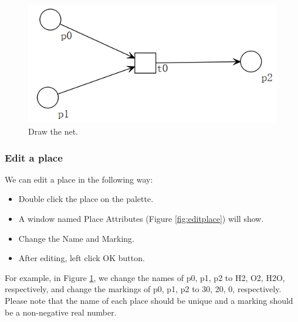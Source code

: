 \documentclass[journal,a4paper,onecolumn]{article}
\begin{document}
\begin{figure}[!hbt]
	\begin{center}
		\includegraphics[width=\columnwidth]{fig2}
		\caption{Draw the net.}
		\label{fig:drawnet}
	\end{center}
\end{figure}


\subsubsection{Edit a place}
We can edit a place in the following way:

\begin{itemize}
	\item Double click the place on the palette.
	\item A window named Place Attributes (Figure \ref{fig:editplace}) will show.
	\item Change the Name and Marking.
	\item After editing, left click OK button.
\end{itemize}

For example, in Figure \ref{fig:drawnet}, we change the names of p0, p1, p2 to H2, O2, H2O, respectively, and change the markings of p0, p1, p2 to 30, 20, 0, respectively. Please note that the name of each place should be unique and a marking should be a non-negative real number.
\end{document}
